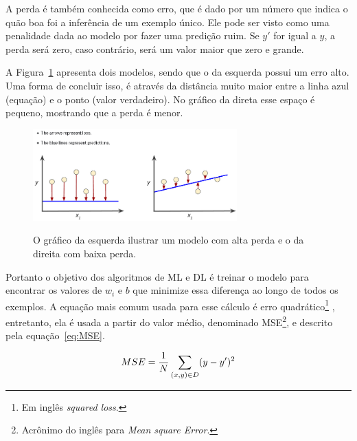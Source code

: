             A perda é também conhecida como erro, que é dado por um número que indica o quão boa foi a inferência de um exemplo único. Ele pode ser visto como uma penalidade dada ao modelo por fazer uma predição ruim. Se $y'$ for igual a $y$, a perda será zero, caso contrário, será um valor maior que zero e grande. 
            
            A Figura~\ref{fig:loss_learning} apresenta dois modelos, sendo que o da esquerda possui um erro alto. Uma forma de concluir isso, é através da distância muito maior entre a linha azul (equação) e o ponto (valor verdadeiro). No gráfico da direta esse espaço é pequeno, mostrando que a perda é menor.
    
            \begin{figure}[H]
                \centering
                \caption{O gráfico da esquerda ilustrar um modelo com alta perda e o da direita com baixa perda.}
                \includegraphics[width=0.7\textwidth]{fig/2-fundamentacao/aprendizado/loss_learning.png}
                \label{fig:loss_learning}
            \end{figure}
            
             Portanto o objetivo dos algoritmos de ML e DL é treinar o modelo para encontrar os valores de $w_i$ e $b$ que minimize essa diferença ao longo de todos os exemplos. A equação mais comum usada para esse cálculo é erro quadrático\footnote{Em inglês \textit{squared loss}.} , entretanto, ela é usada a partir do valor médio, denominado \gls{MSE}\footnote{Acrônimo do inglês para \textit{Mean square Error}.}, e descrito pela equação~\ref{eq:MSE}\cite{TotalTen29:online}.
            
            \begin{equation}
                \centering
                MSE =  \frac{1}{N} \sum_{(x,y)\in D}  (y - y')^2
                \label{eq:MSE}
            \end{equation}
        
